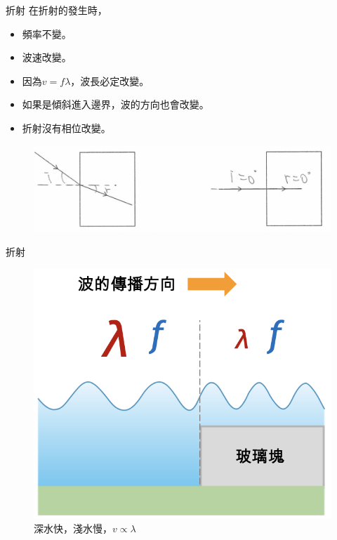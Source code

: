 \documentclass[13pt]{beamer}
\begin{document}
\begin{frame}{折射}
    在折射的發生時，
    \begin{itemize}
        \item 頻率不變。
        \item 波速改變。
        \item 因為\(v=f\lambda\)，波長必定改變。
        \item 如果是傾斜進入邊界，波的方向也會改變。
        \item 折射沒有相位改變。
    \end{itemize}
    \begin{figure}
        \centering
        \includegraphics[width=0.75\linewidth]{images/Screenshot 2023-09-27 at 7.42.27 PM.png}
    \end{figure}
\end{frame}

\begin{frame}{折射}
    \begin{figure}
        \centering
        \includegraphics[width=0.7\linewidth]{images/Screenshot 2023-09-27 at 7.45.26 PM.png}
        \caption{深水快，淺水慢，$v\propto \lambda$}

    \end{figure}
\end{frame}
\end{document}
